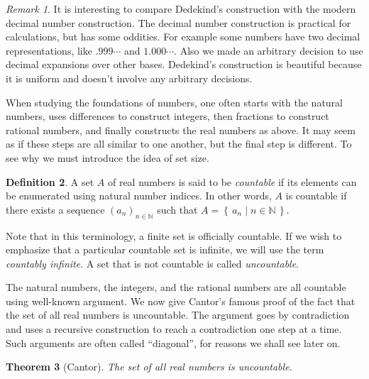 \documentclass[11pt,oneside]{amsbook}
\newcommand{\set}[1]{\left\{\,#1\,\right\}}
\newcommand{\N}{\mathbb N}
\theoremstyle{definition}
\theoremstyle{plain}
\newtheorem{theorem}{Theorem}[section]
\theoremstyle{definition}
\newtheorem{definition}[theorem]{Definition}
\theoremstyle{remark}
\newtheorem{remark}[theorem]{Remark}
\numberwithin{equation}{section}
\numberwithin{figure}{section}
\begin{document}
\begin{remark}
  It is interesting to compare Dedekind's construction with the modern decimal number construction. The decimal number construction is practical for calculations, but has some oddities. For example some numbers have two decimal representations, like $.999\cdots$ and $1.000\cdots$. Also we made an arbitrary decision to use decimal expansions over other bases. Dedekind's construction is beautiful because it is uniform and doesn't involve any arbitrary decisions.
\end{remark}

When studying the foundations of numbers, one often starts with the natural numbers, uses differences to construct integers, then fractions to construct rational numbers, and finally constructs the real numbers as above. It may seem as if these steps are all similar to one another, but the final step is different. To see why we must introduce the idea of set size.

\begin{definition}
  A set $A$ of real numbers is said to be \emph{countable} if its elements can be enumerated using natural number indices. In other words, $A$ is countable if there exists a sequence $(a_n)_{n\in\N}$ such that $A=\set{a_n\mid n\in\N}$.
\end{definition}

Note that in this terminology, a finite set is officially countable. If we wish to emphasize that a particular countable set is infinite, we will use the term \emph{countably infinite}. A set that is not countable is called \emph{uncountable}.

The natural numbers, the integers, and the rational numbers are all countable using well-known argument. We now give Cantor's famous proof of the fact that the set of all real numbers is uncountable. The argument goes by contradiction and uses a recursive construction to reach a contradiction one step at a time. Such arguments are often called ``diagonal'', for reasons we shall see later on.

\begin{theorem}[Cantor]
  \label{thm:cantor}
  The set of all real numbers is uncountable.
\end{theorem}
\end{document}
